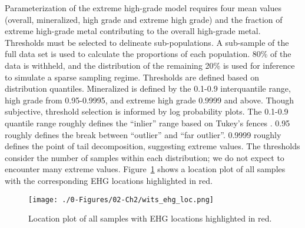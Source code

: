 
Parameterization of the extreme high-grade model requires four mean values (overall, mineralized, high grade and extreme high grade) and the fraction of extreme high-grade metal contributing to the overall high-grade metal. Thresholds must be selected to delineate sub-populations. A sub-sample of the full data set is used to calculate the proportions of each population. 80\% of the data is withheld, and the distribution of the remaining 20\% is used for inference to simulate a sparse sampling regime. Thresholds are defined based on distribution quantiles. Mineralized is defined by the 0.1-0.9 interquantile range, high grade from 0.95-0.9995, and extreme high grade 0.9999 and above. Though subjective, threshold selection is informed by log probability plots. The 0.1-0.9 quantile range roughly defines the ``inlier'' range based on Tukey's fences \citep{tukey1977exploratory}. 0.95 roughly defines the break between ``outlier'' and ``far outlier''. 0.9999 roughly defines the point of tail decomposition, suggesting extreme values. The thresholds consider the number of samples within each distribution; we do not expect to encounter many extreme values. Figure~\ref{fig:wits_ehg_loc} shows a location plot of all samples with the corresponding \gls{EHG} locations highlighted in red.

\begin{figure}[htb!]
    \centering
    \texttt{[image: ./0-Figures/02-Ch2/wits\_ehg\_loc.png]}
    \caption{Location plot of all samples with \gls{EHG} locations highlighted in red.}
    \label{fig:wits_ehg_loc}
\end{figure}

